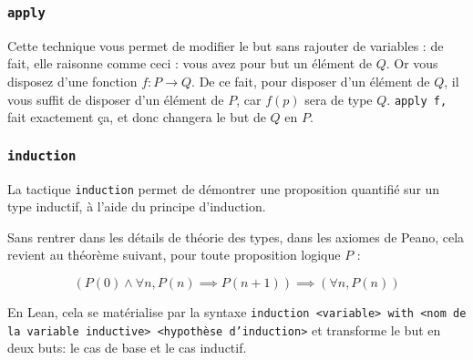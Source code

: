 \subsubsection{\texttt{apply}}
Cette technique vous permet de modifier le but sans rajouter de variables : de fait, elle raisonne comme ceci : vous avez pour but un élément de $Q$. Or vous disposez d'une fonction $f : P \to Q$. De ce fait, pour disposer d'un élément de $Q$, il vous suffit de disposer d'un élément de $P$, car $f(p)$ sera de type $Q$. \texttt{apply f,} fait exactement ça, et donc changera le but de $Q$ en $P$.\\

\subsubsection{\texttt{induction}}

La tactique \texttt{induction} permet de démontrer une proposition quantifié sur un type inductif, à l'aide du principe d'induction.

Sans rentrer dans les détails de théorie des types, dans les axiomes de Peano, cela revient au théorème suivant, pour toute proposition logique $P$ :

\begin{equation*}
\left(P(0) \land \forall n, P(n) \implies P(n + 1)\right) \implies (\forall n, P(n))
\end{equation*}

En Lean, cela se matérialise par la syntaxe \texttt{induction <variable> with <nom de la variable inductive> <hypothèse d'induction>} et transforme le but en deux buts: le cas de base et le cas inductif.
